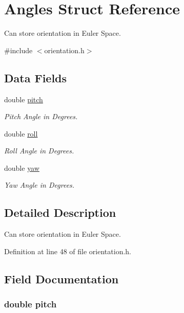 \hypertarget{struct_angles}{\section{Angles Struct Reference}
\label{struct_angles}
}


Can store orientation in Euler Space.  




{\ttfamily \#include $<$orientation.\-h$>$}

\subsection*{Data Fields}
\begin{DoxyCompactItemize}
\item 
double \hyperlink{struct_angles_a34c057a0378030db67bd6a129f37d938}{pitch}
\begin{DoxyCompactList}\small\item\em Pitch Angle in Degrees. \end{DoxyCompactList}\item 
double \hyperlink{struct_angles_a1d3228afa3a1d6773954f40c1e519eb9}{roll}
\begin{DoxyCompactList}\small\item\em Roll Angle in Degrees. \end{DoxyCompactList}\item 
double \hyperlink{struct_angles_a21cd490f6191f66678f55b4c242a10cf}{yaw}
\begin{DoxyCompactList}\small\item\em Yaw Angle in Degrees. \end{DoxyCompactList}\end{DoxyCompactItemize}


\subsection{Detailed Description}
Can store orientation in Euler Space. 

Definition at line 48 of file orientation.\-h.



\subsection{Field Documentation}
\hypertarget{struct_angles_a34c057a0378030db67bd6a129f37d938}{
\subsubsection[{pitch}]{\setlength{\rightskip}{0pt plus 5cm}double pitch}}\label{struct_angles_a34c057a0378030db67bd6a129f37d938}


